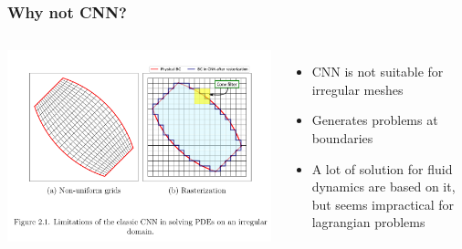\documentclass{beamer}
\begin{document}
\begin{frame}
    \frametitle{Why not CNN?}
\begin{columns}
\includegraphics[scale=0.1]{figures/CNN_Limitations.png}

\begin{itemize}
    \item CNN is not suitable for irregular meshes
    \item Generates problems at boundaries
    \item A lot of solution for fluid dynamics are based on it, but seems impractical for lagrangian problems
\end{itemize}
\end{columns}
\end{frame}
\end{document}
